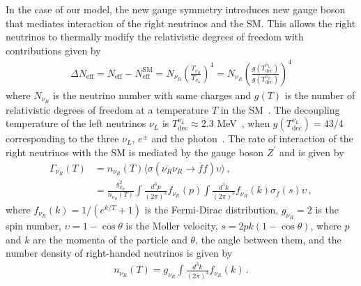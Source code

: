 \documentclass[12pt]{article}
\begin{document}
In the case of our model, the new gauge symmetry introduces  new gauge boson that mediates interaction of the right neutrinos and the SM. This allows the right neutrinos to thermally modify the relativistic degrees of freedom with contributions given by~\cite{Anchordoqui:2012qu,Anchordoqui:2011nh}
%
\begin{align*}
    \Delta N_{\text{eff}} = N_{\text{eff}} - N^{\text{SM}}_{\text{eff}} = N_{\nu_R} \left( \frac{T_{\nu_{R}}}{T_{\nu_{L}}} \right)^{4} = N_{\nu_R} \left( \frac{g(T^{\nu_{L}}_{\text{dec}})}{g(T^{\nu_{R}}_{\text{dec}})} \right)^{4}
\end{align*}
%
where $N_{\nu_R}$ is the neutrino number with same charges and $g(T)$ is the number of relativistic degrees of freedom at a temperature $T$ in the SM~\cite{Aghanim:2018eyx}. The decoupling temperature of the left neutrinos $\nu_L$ is $ T^{\nu_{L}}_{\text{dec}} \approx 2.3 $ MeV~\cite{Enqvist:1991gx}, when $g(T^{\nu_{L}}_{ \text{dec}}) = 43/4 $ corresponding to the three $\nu_{L}$, $e^{\pm} $ and the photon~\cite{Kolb:1990vq}. The rate of interaction of the right neutrinos with the SM is mediated by the gauge boson $Z^{\prime} $ and is given by~\cite{SolagurenBeascoa:2012cz}
%
\begin{align*}
    \Gamma_{\nu_R} (T) &= n_{\nu_R}(T) \langle \sigma(\overline{\nu_{R}} \nu_{R} \to \overline{f} f) \upsilon \rangle \,, \\
    &= \frac{g^{2}_{\nu_R}}{n_{\nu_R}(T)} \int \frac{d^{3} p}{(2 \pi)^{3}} f_{\nu_R}(p) \int \frac{d^{3} k}{(2 \pi)^{3}} f_{\nu_R}(k) \sigma_{f}(s) \upsilon\,,
\end{align*}
%
where $f_{\nu_R}(k)=1/(e^{k/T}+1)$ is the Fermi-Dirac distribution, $g_{\nu_R} = 2$ is the spin number, $\upsilon = 1-\cos{\theta}$ is the Moller velocity, $s = 2 p k (1-\cos{\theta})$, where $p$ and $k$ are the momenta of the particle and $\theta$, the angle between them, and the number density of right-handed neutrinos is given by
\begin{align*}
n_{\nu_R}(T) = g_{\nu_R} \int \frac{d^{3} k}{(2 \pi)^{3}} f_{\nu_R}(k)\,.
\end{align*}
\end{document}
